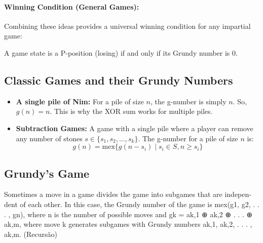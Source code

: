 \paragraph{Winning Condition (General Games):}
Combining these ideas provides a universal winning condition for any impartial game:
\begin{center}
    A game state is a P-position (losing) if and only if its Grundy number is 0.
\end{center}

\subsection*{Classic Games and their Grundy Numbers}
\begin{itemize}
    \item \textbf{A single pile of Nim:} For a pile of size $n$, the g-number is simply $n$. So, $g(n) = n$. This is why the XOR sum works for multiple piles.
    \item \textbf{Subtraction Games:} A game with a single pile where a player can remove any number of stones $s \in \{s_1, s_2, \dots, s_k\}$. The g-number for a pile of size $n$ is:
    $$ g(n) = \text{mex} \{ g(n-s_i) \mid s_i \in S, n \ge s_i \} $$
\end{itemize}

\subsection*{Grundy's Game}
Sometimes a move in a game divides the game into subgames that are indepen-dent of each other.
In this case, the Grundy number of the game is mex({g1, g2, . . . , gn}), where n is the number of
possible moves and gk = ak,1 ⊕ ak,2 ⊕ . . . ⊕ ak,m,
where move k generates subgames with Grundy numbers ak,1, ak,2, . . . , ak,m.
(Recursão)